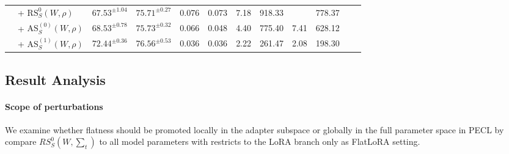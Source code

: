 \documentclass{article}
\theoremstyle{plain}
\theoremstyle{definition}
\theoremstyle{remark}
\begin{document}
\begin{table}[thpb]
{\begin{tabular}{l l cccc cc cccc}
& + $\mathrm{RS}^{0}_S(W,\rho)$  & $67.53^{\pm 1.04}$ & $75.71^{\pm 0.27}$  &0.076 &0.073 &7.18 &918.33 & &778.37\\
& + $\mathrm{AS}^{(0)}_S(W,\rho)$     &$68.53^{\pm 0.78}$ & $75.73^{\pm 0.32}$  & 0.066   & 0.048 & 4.40    & 775.40   & 7.41   & 628.12   \\
 & + $\mathrm{AS}^{(1)}_S(W,\rho)$  &$72.44^{\pm 0.36}$ & $76.56^{\pm 0.53}$  & 0.036   & 0.036 & 2.22    & 261.47   & 2.08   & 198.30\\
\bottomrule
\end{tabular}
}
\end{table}

\subsection{Result Analysis}

\paragraph{Scope of perturbations}



We examine whether flatness should be promoted locally in the adapter subspace or globally in the full parameter space in PECL by compare $RS^0_S(W,\sum_t)$ to all model parameters with restricts to the LoRA branch only as FlatLoRA setting\cite{li2025flatloralowrankadaptationflat}. 

\end{document}
